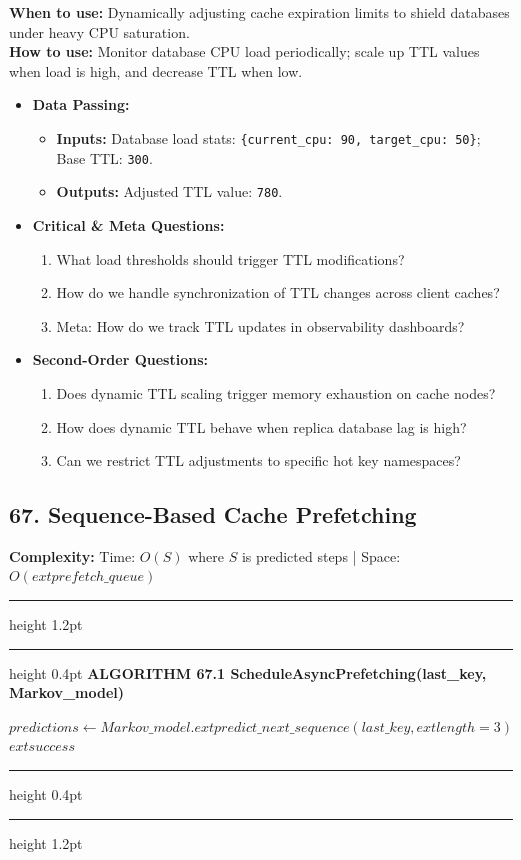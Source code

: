 \documentclass[11pt,a4paper]{article}
\newenvironment{textbookalgo}[2]{%
  \par\addvspace{1.2em}\noindent
  \hrule height 1.2pt
  \vspace{1.5pt}
  \hrule height 0.4pt
  \vspace{5pt}
  {\noindent\large\bfseries\sffamily ALGORITHM #1 \quad #2}
  \par\vspace{5pt}
  \RestyleAlgo{plain}
}{%
  \par\vspace{4pt}
  \hrule height 0.4pt
  \vspace{1.5pt}
  \hrule height 1.2pt
  \par\addvspace{1.2em}
}
\theoremstyle{definition}
\begin{document}
\noindent
\textbf{When to use:} Dynamically adjusting cache expiration limits to shield databases under heavy CPU saturation.\\
\textbf{How to use:} Monitor database CPU load periodically; scale up TTL values when load is high, and decrease TTL when low.
\begin{itemize}[leftmargin=*]
  \item[] \textbf{Data Passing:}
    \begin{itemize}
      \item \textbf{Inputs:} Database load stats: \texttt{\{current\_cpu: 90, target\_cpu: 50\}}; Base TTL: \texttt{300}.
      \item \textbf{Outputs:} Adjusted TTL value: \texttt{780}.
    \end{itemize}
  \item[] \textbf{Critical \& Meta Questions:}
  \begin{enumerate}
    \item What load thresholds should trigger TTL modifications?
    \item How do we handle synchronization of TTL changes across client caches?
    \item Meta: How do we track TTL updates in observability dashboards?
  \end{enumerate}
  \item[] \textbf{Second-Order Questions:}
  \begin{enumerate}
    \item Does dynamic TTL scaling trigger memory exhaustion on cache nodes?
    \item How does dynamic TTL behave when replica database lag is high?
    \item Can we restrict TTL adjustments to specific hot key namespaces?
  \end{enumerate}
\end{itemize}
\medskip

\clearpage
\subsection{67. Sequence-Based Cache Prefetching}


\noindent
\textbf{Complexity:} Time: $O(S)$ where $S$ is predicted steps | Space: $O(	ext{prefetch\_queue})$
\smallskip

\begin{textbookalgo}{67.1}{ScheduleAsyncPrefetching(last\_key, Markov\_model)}
\begin{algorithm}[H]
$predictions \leftarrow Markov\_model.	ext{predict\_next\_sequence}(last\_key, 	ext{length}=3)$\;
\Return $	ext{success}$\;
\end{algorithm}
\end{textbookalgo}
\end{document}
